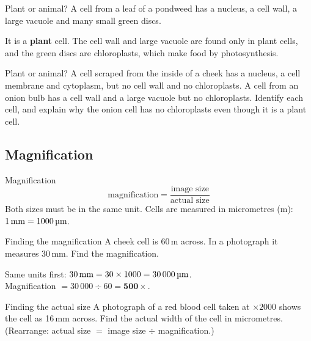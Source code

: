 \begin{workedex}{Plant or animal?}
A cell from a leaf of a pondweed has a nucleus, a cell wall, a large vacuole and many small green discs.

\smallskip
It is a \textbf{plant} cell. The cell wall and large vacuole are found only in plant cells, and the green discs are chloroplasts, which make food by photosynthesis.
\end{workedex}

\begin{wedo}{Plant or animal?}
A cell scraped from the inside of a cheek has a nucleus, a cell membrane and cytoplasm, but no cell wall and no chloroplasts. A cell from an onion bulb has a cell wall and a large vacuole but no chloroplasts. Identify each cell, and explain why the onion cell has no chloroplasts even though it is a plant cell.
\answerbox{5cm}
\end{wedo}

\subsection{Magnification}\label{sub:a1.2}

\begin{skillbox}{Magnification}
\[ \text{magnification} = \frac{\text{image size}}{\text{actual size}} \]
Both sizes must be in the same unit. Cells are measured in micrometres (\textmu m): $1\,\text{mm} = 1000\,\text{\textmu m}$.
\end{skillbox}

\begin{workedex}{Finding the magnification}
A cheek cell is 60\,\textmu m across. In a photograph it measures 30\,mm. Find the magnification.

\smallskip
Same units first: $30\,\text{mm} = 30 \times 1000 = 30\,000\,\text{\textmu m}$.\\
Magnification $= 30\,000 \div 60 = \mathbf{500\times}$.
\end{workedex}

\begin{wedo}{Finding the actual size}
A photograph of a red blood cell taken at $\times 2000$ shows the cell as 16\,mm across. Find the actual width of the cell in micrometres. (Rearrange: actual size $=$ image size $\div$ magnification.)
\workbox{4.5cm}
\end{wedo}

\label{prac:1}


